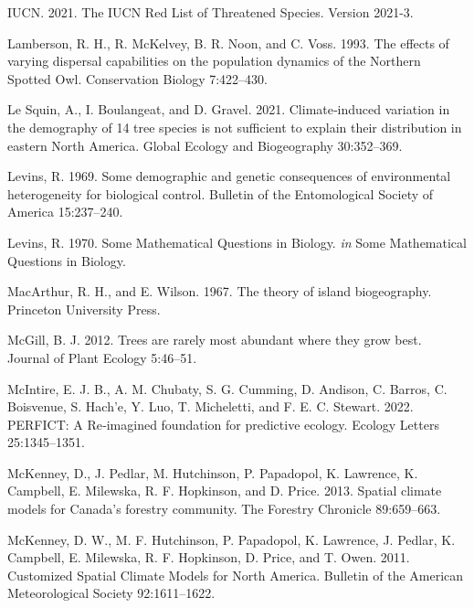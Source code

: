 \documentclass[12pt]{article}
\newlength{\cslhangindent}
\newenvironment{cslreferences}%
  {\setlength{\parindent}{0pt}%
  \everypar{\setlength{\hangindent}{\cslhangindent}}\ignorespaces}%
  {\par}
\begin{document}
\begin{cslreferences}
\leavevmode\hypertarget{ref-iucn_iucn_2021}{}%
IUCN. 2021. The IUCN Red List of Threatened Species. Version 2021-3.

\leavevmode\hypertarget{ref-lamberson_effects_1993}{}%
Lamberson, R. H., R. McKelvey, B. R. Noon, and C. Voss. 1993. The
effects of varying dispersal capabilities on the population dynamics of
the Northern Spotted Owl. Conservation Biology 7:422--430.

\leavevmode\hypertarget{ref-le_squin_climateinduced_2021}{}%
Le Squin, A., I. Boulangeat, and D. Gravel. 2021. Climate‐induced
variation in the demography of 14 tree species is not sufficient to
explain their distribution in eastern North America. Global Ecology and
Biogeography 30:352--369.

\leavevmode\hypertarget{ref-levins_demographic_1969}{}%
Levins, R. 1969. Some demographic and genetic consequences of
environmental heterogeneity for biological control. Bulletin of the
Entomological Society of America 15:237--240.

\leavevmode\hypertarget{ref-levins_mathematical_1970}{}%
Levins, R. 1970. Some Mathematical Questions in Biology. \emph{in} Some
Mathematical Questions in Biology.

\leavevmode\hypertarget{ref-macarthur_theory_1967}{}%
MacArthur, R. H., and E. Wilson. 1967. The theory of island
biogeography. Princeton University Press.

\leavevmode\hypertarget{ref-mcgill_trees_2012}{}%
McGill, B. J. 2012. Trees are rarely most abundant where they grow best.
Journal of Plant Ecology 5:46--51.

\leavevmode\hypertarget{ref-mcintire_perfict_2022}{}%
McIntire, E. J. B., A. M. Chubaty, S. G. Cumming, D. Andison, C. Barros,
C. Boisvenue, S. Hach\a'e, Y. Luo, T. Micheletti, and F. E. C. Stewart.
2022. PERFICT: A Re‐imagined foundation for predictive ecology. Ecology
Letters 25:1345--1351.

\leavevmode\hypertarget{ref-mckenney_spatial_2013}{}%
McKenney, D., J. Pedlar, M. Hutchinson, P. Papadopol, K. Lawrence, K.
Campbell, E. Milewska, R. F. Hopkinson, and D. Price. 2013. Spatial
climate models for Canada's forestry community. The Forestry Chronicle
89:659--663.

\leavevmode\hypertarget{ref-mckenney_customized_2011}{}%
McKenney, D. W., M. F. Hutchinson, P. Papadopol, K. Lawrence, J. Pedlar,
K. Campbell, E. Milewska, R. F. Hopkinson, D. Price, and T. Owen. 2011.
Customized Spatial Climate Models for North America. Bulletin of the
American Meteorological Society 92:1611--1622.


\end{cslreferences}
\end{document}
